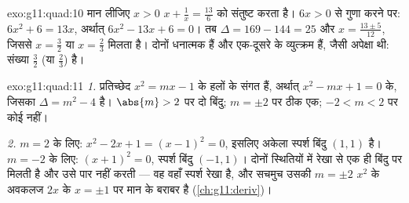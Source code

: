 \begin{solution}{exo:g11:quad:10}
मान लीजिए $x > 0$ $x + \frac1x = \frac{13}{6}$ को संतुष्ट करता है। $6x > 0$ से गुणा करने पर: $6x^2 + 6 = 13x$,
अर्थात् $6x^2 - 13x + 6 = 0$। तब $\Delta = 169 - 144 = 25$ और $x = \frac{13 \pm 5}{12}$, जिससे $x = \frac32$ या $x = \frac23$ मिलता है। दोनों
धनात्मक हैं और एक-दूसरे के व्युत्क्रम हैं, जैसी अपेक्षा थी: संख्या $\frac32$
(या $\frac23$) है।
\end{solution}

\begin{solution}{exo:g11:quad:11}
\emph{1.} प्रतिच्छेद $x^2 = mx - 1$ के हलों के संगत हैं, अर्थात् $x^2 - mx + 1 = 0$ के, जिसका
 $\Delta = m^2 - 4$ है। $\abs{m} > 2$ पर दो बिंदु; $m = \pm 2$ पर ठीक एक; $-2 < m < 2$ पर कोई नहीं।

\emph{2.} $m = 2$ के लिए: $x^2 - 2x + 1 = (x-1)^2 = 0$, इसलिए अकेला स्पर्श बिंदु $(1, 1)$ है। $m = -2$ के
लिए: $(x+1)^2 = 0$, स्पर्श बिंदु $(-1, 1)$। दोनों स्थितियों में रेखा  से एक ही
बिंदु पर मिलती है और उसे पार नहीं करती --- वह वहाँ स्पर्श रेखा है, और सचमुच
उसकी  $m = \pm 2$ $x^2$ के अवकलज $2x$ के $x = \pm 1$ पर मान के बराबर है (\cref{ch:g11:deriv})।
\end{solution}

